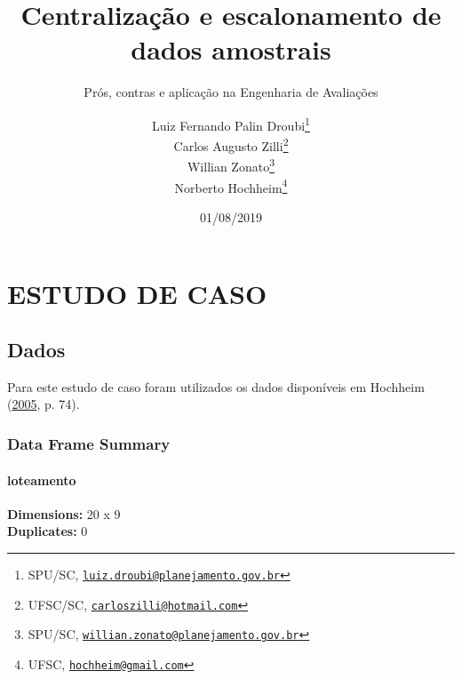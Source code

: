 \documentclass[a4paper, 12pt]{article}
\title{Centralização e escalonamento de dados amostrais}
\subtitle{Prós, contras e aplicação na Engenharia de Avaliações}
\author{Luiz Fernando Palin Droubi\footnote{SPU/SC,
  \href{mailto:luiz.droubi@planejamento.gov.br}{\nolinkurl{luiz.droubi@planejamento.gov.br}}} \\ Carlos Augusto Zilli\footnote{UFSC/SC,
  \href{mailto:carloszilli@hotmail.com}{\nolinkurl{carloszilli@hotmail.com}}} \\ Willian Zonato\footnote{SPU/SC,
  \href{mailto:willian.zonato@planejamento.gov.br}{\nolinkurl{willian.zonato@planejamento.gov.br}}} \\ Norberto Hochheim\footnote{UFSC,
  \href{mailto:hochheim@gmail.com}{\nolinkurl{hochheim@gmail.com}}}}
\date{01/08/2019}
\let\oldparagraph\paragraph
\renewcommand{\paragraph}[1]{\oldparagraph{#1}\mbox{}}
\begin{document}
\maketitle

\hypertarget{estudo-de-caso}{%
\section{ESTUDO DE CASO}\label{estudo-de-caso}}

\hypertarget{dados}{%
\subsection{Dados}\label{dados}}

Para este estudo de caso foram utilizados os dados disponíveis em
Hochheim (\protect\hyperlink{ref-hochheim2005}{2005}, p. 74).

\hypertarget{data-frame-summary}{%
\subsubsection{Data Frame Summary}\label{data-frame-summary}}

\hypertarget{loteamento}{%
\paragraph{loteamento}\label{loteamento}}

\textbf{Dimensions:} 20 x 9\\
\textbf{Duplicates:} 0
\end{document}
